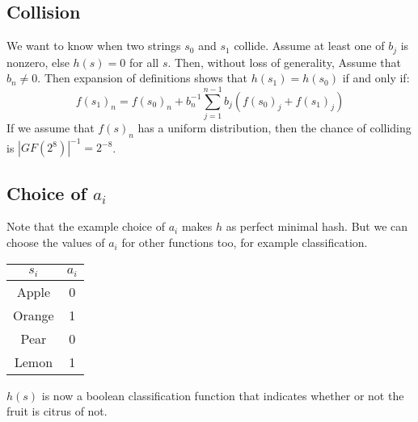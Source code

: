 %
%

\subsection{Collision}
We want to know when two strings $s_0$ and $s_1$ collide.
Assume at least one of $b_j$ is nonzero,
else $h(s) = 0$ for all $s$.
Then, 
without loss of generality,
Assume that $b_n\neq 0$.
Then expansion of definitions shows that $h(s_1)=h(s_0)$ if and only if:
\[f(s_1)_n = f(s_0)_n+b_n^{-1}\sum_{j=1}^{n-1}b_j(f(s_0)_j+f(s_1)_j)\]
If we assume that $f(s)_n$ has a uniform distribution,
then the chance of colliding is $|GF(2^8)|^{-1} = 2^{-8}$.

\subsection{Choice of $a_i$}
Note that the example choice of $a_i$ makes $h$ as perfect minimal hash.
But we can choose the values of $a_i$ for other functions too,
for example classification.

\begin{center}
\begin{tabular}{|c|c|}
	\hline
	$s_i$ & $a_i$\\
	\hline
	Apple& 0\\
	Orange& 1\\
	Pear& 0\\
	Lemon& 1\\
	\hline
\end{tabular}
\end{center}
$h(s)$ is now a boolean classification function that indicates whether or not the fruit is citrus of not.

